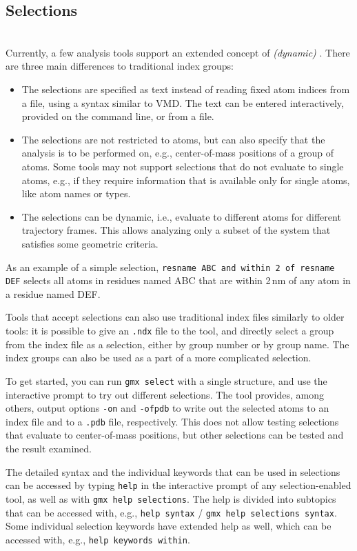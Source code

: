 \subsection{Selections}
\label{subsec:selections}
{\tt {}}\\
Currently, a few analysis tools support an extended concept of {\em
(dynamic) }.  There are three main differences to
traditional index groups:
\begin{itemize}
  \item The selections are specified as text instead of reading fixed
    atom indices from a file, using a syntax similar to VMD.  The text
    can be entered interactively, provided on the command line, or from
    a file.
  \item The selections are not restricted to atoms, but can also specify
    that the analysis is to be performed on, e.g., center-of-mass
    positions of a group of atoms.
    Some tools may not support selections that do not evaluate to single
    atoms, e.g., if they require information that is available only for
    single atoms, like atom names or types.
  \item The selections can be dynamic, i.e., evaluate to different atoms
    for different trajectory frames.  This allows analyzing only a
    subset of the system that satisfies some geometric criteria.
\end{itemize}
As an example of a simple selection,
{\tt resname ABC and within 2 of resname DEF}
selects all atoms in residues named ABC that are within 2\,nm of any
atom in a residue named DEF.

Tools that accept selections can also use traditional index files
similarly to older tools: it is possible to give an {\tt .ndx} file to
the tool, and directly select a group from the index file as a
selection, either by group number or by group name.  The index groups
can also be used as a part of a more complicated selection.

To get started, you can run {\tt gmx select} with a single structure,
and use the interactive prompt to try out different selections.
The tool provides, among others, output options {\tt -on} and
{\tt -ofpdb} to write out the selected atoms to an index file and to a
{\tt .pdb} file, respectively.  This does not allow testing selections
that evaluate to center-of-mass positions, but other selections can be
tested and the result examined.

The detailed syntax and the individual keywords that can be used in
selections can be accessed by typing {\tt help} in the interactive
prompt of any selection-enabled tool, as well as with
{\tt gmx help selections}.  The help is divided into subtopics that can
be accessed with, e.g., {\tt help syntax} / {\tt gmx help selections
syntax}.  Some individual selection keywords have extended help as well,
which can be accessed with, e.g., {\tt help keywords within}.

